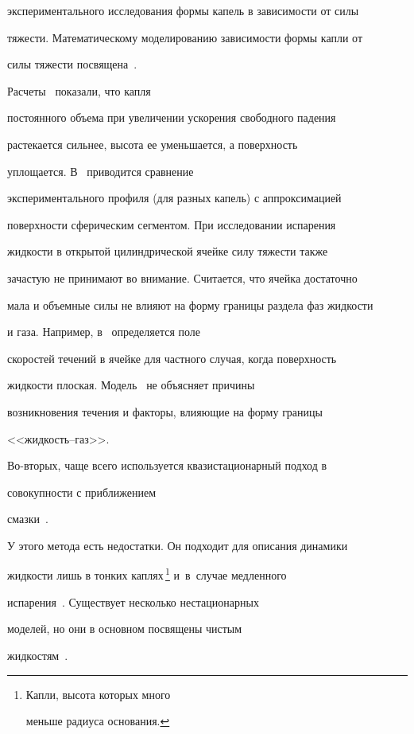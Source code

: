 экспериментального исследования формы капель в зависимости от силы

тяжести. Математическому моделированию зависимости формы капли от

силы тяжести посвящена~\cite{BartashevichKuznetsovKabov2010}.

Расчеты~\cite{BartashevichKuznetsovKabov2010} показали, что капля

постоянного объема при увеличении ускорения свободного падения

растекается сильнее, высота ее уменьшается, а поверхность

уплощается. В~\cite{KonovalovPahomovi2011} приводится сравнение

экспериментального профиля (для разных капель) с аппроксимацией

поверхности сферическим сегментом. При исследовании испарения

жидкости в открытой цилиндрической ячейке силу тяжести также

зачастую не принимают во внимание. Считается, что ячейка достаточно

мала и объемные силы не влияют на форму границы раздела фаз жидкости

и газа. Например, в~\cite{Tarasevich2009} определяется поле

скоростей течений в ячейке для частного случая, когда поверхность

жидкости плоская. Модель~\cite{Rieger} не объясняет причины

возникновения течения и факторы, влияющие на форму границы

<<жидкость--газ>>.



Во-вторых, чаще всего используется квазистационарный подход в

совокупности с приближением

смазки~\cite{EhrhardDavis1991,Fischer2002,Okuzono2009,tarasevich2011CPS,MakiKumar2011}.

У этого метода есть недостатки. Он подходит для описания динамики

жидкости лишь в тонких каплях\,\!\footnote{Капли, высота которых много

меньше радиуса основания.}\!\! и~в~случае медленного

испарения~\cite{Kolegov2014c}. Существует несколько нестационарных

моделей, но они в основном посвящены чистым

жидкостям~\cite{Mollaret2004,Barash2009b}.



